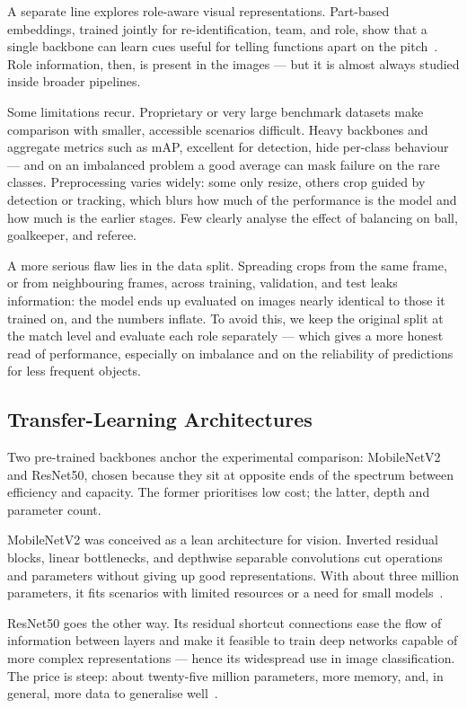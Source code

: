 \documentclass[preprint,12pt]{elsarticle}
\begin{document}
A separate line explores role-aware visual representations. Part-based embeddings, trained jointly for re-identification, team, and role, show that a single backbone can learn cues useful for telling functions apart on the pitch~\cite{somers2024multitask}. Role information, then, is present in the images --- but it is almost always studied inside broader pipelines.

Some limitations recur. Proprietary or very large benchmark datasets make comparison with smaller, accessible scenarios difficult. Heavy backbones and aggregate metrics such as mAP, excellent for detection, hide per-class behaviour --- and on an imbalanced problem a good average can mask failure on the rare classes. Preprocessing varies widely: some only resize, others crop guided by detection or tracking, which blurs how much of the performance is the model and how much is the earlier stages. Few clearly analyse the effect of balancing on ball, goalkeeper, and referee.

A more serious flaw lies in the data split. Spreading crops from the same frame, or from neighbouring frames, across training, validation, and test leaks information: the model ends up evaluated on images nearly identical to those it trained on, and the numbers inflate. To avoid this, we keep the original split at the match level and evaluate each role separately --- which gives a more honest read of performance, especially on imbalance and on the reliability of predictions for less frequent objects.

\subsection{Transfer-Learning Architectures}

Two pre-trained backbones anchor the experimental comparison: MobileNetV2 and ResNet50, chosen because they sit at opposite ends of the spectrum between efficiency and capacity. The former prioritises low cost; the latter, depth and parameter count.

MobileNetV2 was conceived as a lean architecture for vision. Inverted residual blocks, linear bottlenecks, and depthwise separable convolutions cut operations and parameters without giving up good representations. With about three million parameters, it fits scenarios with limited resources or a need for small models~\cite{sandler2018mobilenetv2,martins2025mobilenet}.

ResNet50 goes the other way. Its residual shortcut connections ease the flow of information between layers and make it feasible to train deep networks capable of more complex representations --- hence its widespread use in image classification. The price is steep: about twenty-five million parameters, more memory, and, in general, more data to generalise well~\cite{he2016deep}.
\end{document}
